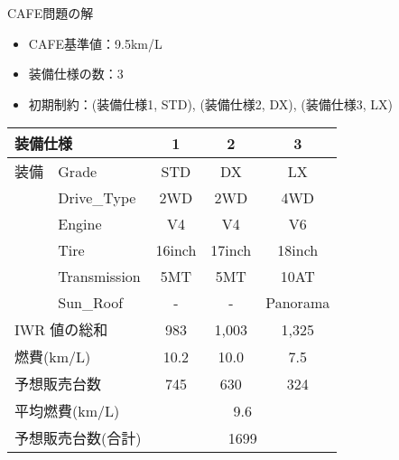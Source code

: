 \documentclass[dvipdfmx, 11pt]{beamer}
\begin{document}
\begin{frame}{CAFE問題の解}
 \begin{itemize}
  \item CAFE基準値：9.5km/L
  \item 装備仕様の数：3
  \item 初期制約：(装備仕様1, STD), (装備仕様2, DX), (装備仕様3, LX)
 \end{itemize}
 \begin{exampleblock}{}
  \centering
  \begin{tabular}{l|l|c|c|c} 
    \multicolumn{2}{l|}{装備仕様}               & 1	& 2 	 & 3	\\  \hline
    装備 & \textsf{Grade}        & \textsf{STD}    & \textsf{DX}     & \textsf{LX}\\
    &\textsf{Drive\_Type}  & \textsf{2WD}    & \textsf{2WD}    & \alert{4WD}\\
    &\textsf{Engine}	  & \textsf{V4}     & \alert{V4}     & \textsf{V6}\\
    &\textsf{Tire}	  & \textsf{16inch} & \textsf{17inch} & \textsf{18inch}\\
    &\textsf{Transmission} & \textsf{5MT}    & \alert{5MT}    & \textsf{10AT}\\
    &\textsf{Sun\_Roof}    & -               & \alert{-} & \alert{Panorama}  \\ \hline
    \multicolumn{2}{l|}{IWR 値の総和}           & 983  & 1,003   & 1,325 \\ %
    \multicolumn{2}{l|}{燃費(km/L)}      & 10.2  & 10.0     & 7.5 \\ %
    \multicolumn{2}{l|}{予想販売台数}    & 745   & 630   & 324  \\ \hline
    \multicolumn{2}{l|}{平均燃費(km/L)}  & \multicolumn{3}{c}{9.6} \\ 
    \multicolumn{2}{l|}{予想販売台数(合計)}  & \multicolumn{3}{c}{1699} \\ 
  \end{tabular}
 \end{exampleblock}
\end{frame}
\end{document}
